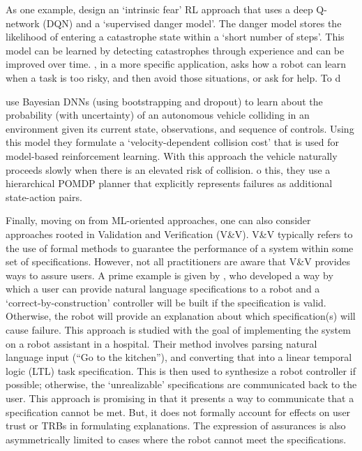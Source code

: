 As one example, \citet{Lipton2016-dq} design an `intrinsic fear' RL approach that uses a deep Q-network (DQN) and a `supervised danger model'. The danger model stores the likelihood of entering a catastrophe state within a `short number of steps'. This model can be learned by detecting catastrophes through experience and can be improved over time. \citet{Curran2016-ij}, in a more specific application, asks how a robot can learn when a task is too risky, and then avoid those situations, or ask for help. To d

\citet{Kahn2017-vy} use Bayesian DNNs (using bootstrapping and dropout) to learn about the probability (with uncertainty) of an autonomous vehicle colliding in an environment given its current state, observations, and sequence of controls. Using this model they formulate a `velocity-dependent collision cost' that is used for model-based reinforcement learning. With this approach the vehicle naturally proceeds slowly when there is an elevated risk of collision. o this, they use a hierarchical POMDP planner that explicitly represents failures as additional state-action pairs.

Finally, moving on from ML-oriented approaches, one can also consider approaches rooted in Validation and Verification (V\&V). V\&V typically refers to the use of formal methods to guarantee the performance of a system within some set of specifications. However, not all practitioners are aware that V\&V provides ways to assure users. A prime example is given by \citet{Raman2013-mz}, who developed a way by which a user can provide natural language specifications to a robot and a `correct-by-construction' controller will be built if the specification is valid. Otherwise, the robot will provide an explanation about which specification(s) will cause failure. This approach is studied with the goal of implementing the system on a robot assistant in a hospital. Their method involves parsing natural language input (``Go to the kitchen''), and converting that into a linear temporal logic (LTL) task specification. This is then used to synthesize a robot controller if possible; otherwise, the `unrealizable' specifications are communicated back to the user. This approach is promising in that it presents a way to communicate that a specification cannot be met. But, it does not formally account for effects on user trust or TRBs in formulating explanations. The expression of assurances is also asymmetrically limited to cases where the robot cannot meet the specifications. 

